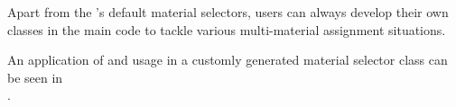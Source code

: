 Apart from the \akantu's default material selectors, users can always
develop their own classes in the main code to tackle various
multi-material assignment situations.

An application of  and usage in
a customly generated material selector class can be seen in \\
. \\





